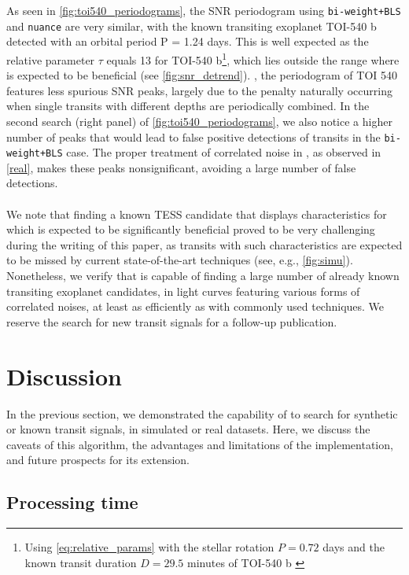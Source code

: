 \documentclass[modern]{aastex631}
\begin{document}
As seen in \autoref{fig:toi540_periodograms}, the SNR periodogram using \texttt{bi-weight+BLS} and \texttt{nuance} are very similar, with the known transiting exoplanet TOI-540 b detected with an orbital period P = 1.24 days. This is well expected as the relative parameter $\tau$ equals 13 for TOI-540 b\footnote{Using \autoref{eq:relative_params} with the stellar rotation $P=0.72$ days and the known transit duration $D=29.5$ minutes of TOI-540 b \citep{TOI540}}, which lies outside the range where \nuancemethod{} is expected to be beneficial (see \autoref{fig:snr_detrend}). , the \nuance{} periodogram of TOI 540 features less spurious SNR peaks, largely due to the penalty naturally occurring when single transits with different depths are periodically combined. In the second search (right panel) of \autoref{fig:toi540_periodograms}, we also notice a higher number of peaks that would lead to false positive detections of transits in the \texttt{bi-weight+BLS} case. The proper treatment of correlated noise in \nuance{}, as observed in \autoref{real}, makes these peaks nonsignificant, avoiding a large number of false detections.\\\\
We note that finding a known TESS candidate that displays characteristics for which \nuance{} is expected to be significantly beneficial proved to be very challenging during the writing of this paper, as transits with such characteristics are expected to be missed by current state-of-the-art techniques (see, e.g., \autoref{fig:simu}). Nonetheless, we verify that \nuancemethod{} is capable of finding a large number of already known transiting exoplanet candidates, in light curves featuring various forms of correlated noises, at least as efficiently as with commonly used techniques. We reserve the search for new transit signals for a follow-up publication.

\newpage
\section{Discussion}\label{discussion}

In the previous section, we demonstrated the capability of \nuance{} to search for synthetic or known transit signals, in simulated or real datasets. Here, we discuss the caveats of this algorithm, the advantages and limitations of the \nuancecode{} implementation, and future prospects for its extension.

\subsection{Processing time}
\end{document}
